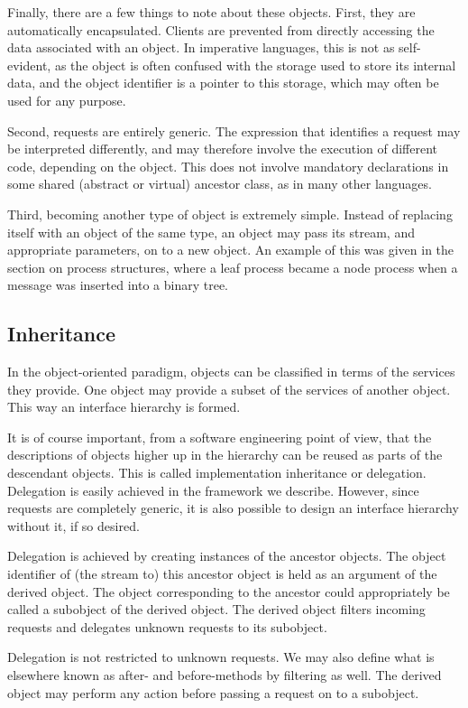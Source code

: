 Finally, there are a few things to note about these objects.  First,
they are automatically encapsulated.  Clients are prevented from
directly accessing the data associated with an object.  In imperative
languages, this is not as self-evident, as the object is often
confused with the storage used to store its internal data, and the
object identifier is a pointer to this storage, which may often be
used for any purpose.

Second, requests are entirely generic.  The expression that identifies
a request may be interpreted differently, and may therefore involve
the execution of different code, depending on the object.  This does
not involve mandatory declarations in some shared (abstract or
virtual) ancestor class, as in many other languages.

Third, becoming another type of object is extremely simple.  Instead of
replacing itself with an object of the same type, an object may pass
its stream, and appropriate parameters, on to a new object.  An example
of this was given in the section on process structures, where a leaf
process became a node process when a message was inserted into a
binary tree.

\subsection{Inheritance}

In the object-oriented paradigm, objects can be classified in terms of
the services they provide.  One object may provide a subset of the
services of another object.  This way an interface hierarchy is formed.

It is of course important, from a software engineering point of view,
that the descriptions of objects higher up in the hierarchy can be
reused as parts of the descendant objects.  This is called
implementation inheritance or delegation.  Delegation is easily
achieved in the framework we describe.  However, since requests are
completely generic, it is also possible to design an interface
hierarchy without it, if so desired.

Delegation is achieved by creating instances of the ancestor
objects.  The object identifier of (the stream to) this ancestor object
is held as an argument of the derived object.  The object corresponding
to the ancestor could appropriately be called a subobject of the
derived object.  The derived object filters incoming requests and
delegates unknown requests to its subobject.

Delegation is not restricted to unknown requests.  We may also define
what is elsewhere known as after- and before-methods by filtering as
well.  The derived object may perform any action before passing a
request on to a subobject.

